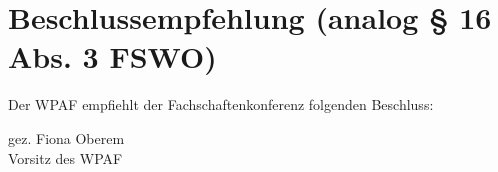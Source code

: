 \documentclass[a4paper]{scrartcl}
\newcommand{\fachschaft}{Kulturanthrophologie}
\newcommand{\wahltermin}{18. -- 20. Dezember 2019}
\newcommand{\vorsitz}{Fiona Oberem}
\begin{document}

\section*{Beschlussempfehlung (analog § 16 Abs. 3 FSWO)}

Der WPAF empfiehlt der Fachschaftenkonferenz folgenden Beschluss:

\vspace{1em}



gez. \vorsitz\\
Vorsitz des WPAF
\end{document}
